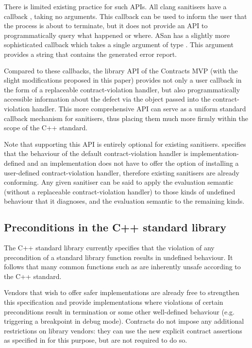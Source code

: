 There is limited existing practice for such APIs. All clang sanitisers have a callback , taking no arguments. This callback can be used to inform the user that the process is about to terminate, but it does not provide an API to programmatically query what happened or where. ASan has a slightly more sophisticated callback  which takes a single argument of type . This argument provides a string that contains the generated error report.

Compared to these callbacks, the library API of the Contracts MVP (with the slight modifications proposed in this paper) provides not only a user callback in the form of a replaceable contract-violation handler, but also programmatically accessible information about the defect via the  \mbox{} object passed into the contract-violation handler. This more comprehensive API can serve as a uniform standard callback mechanism for sanitisers, thus placing them much more firmly within the scope of the C++ standard.

Note that supporting this API is entirely optional for existing sanitisers. \cite{P2900R7} specifies that the behaviour of the default contract-violation handler is implementation-defined and an implementation does not have to offer the option of installing a user-defined contract-violation handler, therefore existing sanitisers are already conforming. Any given sanitiser can be said to apply the  evaluation semantic (without a replaceable contract-violation handler) to those kinds of undefined behaviour that it diagnoses, and the  evaluation semantic to the remaining kinds.

\subsection{Preconditions in the C++ standard library}

The C++ standard library currently specifies that the violation of any precondition of a standard library function results in undefined behaviour. It follows that many common functions such as  are inherently unsafe according to the C++ standard.

Vendors that wish to offer safer implementations are already free to strengthen this specification and provide implementations where violations of certain preconditions result in termination or some other well-defined behaviour (e.g. triggering a breakpoint in debug mode). Contracts do not impose any additional restrictions on library vendors: they can use the new explicit contract assertions as specified in \cite{P2900R7} for this purpose, but are not required to do so.

